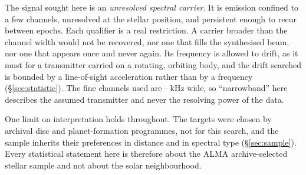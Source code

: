 The signal sought here is an \emph{unresolved spectral carrier}. It is
emission confined to a few channels, unresolved at the stellar position,
and persistent enough to recur between epochs. Each qualifier is a real
restriction. A carrier broader than the channel width would not be
recovered, nor one that fills the synthesised beam, nor one that appears
once and never again. Its frequency is allowed to drift, as it must for a
transmitter carried on a rotating, orbiting body, and the drift searched is
bounded by a line-of-sight acceleration rather than by a frequency
(\S\ref{sec:statistic}). The fine channels used are
\ChanLoA--\ChanHiA\,kHz wide, so ``narrowband'' here describes the assumed
transmitter and never the resolving power of the data.

One limit on interpretation holds throughout. The targets were chosen by
archival disc and planet-formation programmes, not for this search, and
the sample inherits their preferences in distance and in spectral type
(\S\ref{sec:sample}). Every statistical statement here is therefore about
the ALMA archive-selected stellar sample and not about the solar
neighbourhood.
